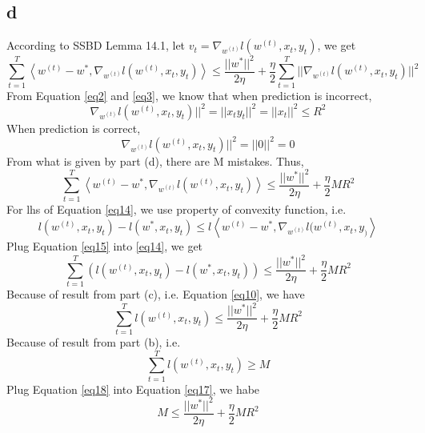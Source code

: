 \documentclass{article}
\begin{document}
	\subsection{d}
	According to SSBD Lemma 14.1, let $v_t = \nabla_{w^{(t)}}l(w^{(t)},x_t,y_t)$, we get
	\begin{equation}
	\sum_{t=1}^{T}\left<w^{(t)}-w^*,\nabla_{w^{(t)}}l(w^{(t)},x_t,y_t)\right> \leq \frac{||w^*||^2}{2\eta}+\frac{\eta}{2}\sum_{t=1}^{T}|| \nabla_{w^{(t)}}l(w^{(t)},x_t,y_t)||^2
	\label{eq11}
	\end{equation}
	From Equation \ref{eq2} and \ref{eq3}, we know that when prediction is incorrect,
	\begin{equation}
	\nabla_{w^{(t)}}l(w^{(t)},x_t,y_t)||^2=||x_ty_t||^2 =||x_t||^2\leq R^2
	\label{eq12}
	\end{equation}
	When prediction is correct,
	\begin{equation}
	\nabla_{w^{(t)}}l(w^{(t)},x_t,y_t)||^2=||0||^2=0
	\label{eq13}
	\end{equation}
	From what is given by part (d), there are M mistakes. Thus,
	\begin{equation}
	\sum_{t=1}^{T}\left<w^{(t)}-w^*,\nabla_{w^{(t)}}l(w^{(t)},x_t,y_t)\right> \leq \frac{||w^*||^2}{2\eta}+\frac{\eta}{2}MR^2
	\label{eq14}
	\end{equation}
	For lhs of Equation \ref{eq14}, we use property of convexity function, i.e.
	\begin{equation}
	l(w^{(t)},x_t,y_t)-l(w^*,x_t,y_t) \leq l\left<w^{(t)}-w^*,\nabla_{w^{(t)}}l(w^{(t)},x_t,y_)\right>
	\label{eq15}
	\end{equation}
	Plug Equation \ref{eq15} into \ref{eq14}, we get
	\begin{equation}
	\sum_{t=1}^{T}(l(w^{(t)},x_t,y_t)-l(w^*,x_t,y_t)) \leq \frac{||w^*||^2}{2\eta}+\frac{\eta}{2}MR^2
	\label{eq16}
	\end{equation}
	Because of result from part (c), i.e. Equation \ref{eq10}, we have
	\begin{equation}
	\sum_{t=1}^{T}l(w^{(t)},x_t,y_t) \leq \frac{||w^*||^2}{2\eta}+\frac{\eta}{2}MR^2
	\label{eq17}
	\end{equation}
	Because of result from part (b), i.e.
	\begin{equation}
	\sum_{t=1}^{T}l(w^{(t)},x_t,y_t) \geq M
	\label{eq18}
	\end{equation}
	Plug Equation \ref{eq18} into Equation \ref{eq17}, we habe
	\begin{equation}
	M \leq \frac{||w^*||^2}{2\eta}+\frac{\eta}{2}MR^2
	\label{eq19}
	\end{equation}
\end{document}
